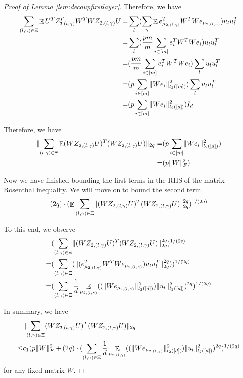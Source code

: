 \documentclass[11pt]{amsart}
\numberwithin{equation}{section}
\numberwithin{equation}{section}
\DeclareMathOperator{\E}{\mathbb{E}}
\DeclarePairedDelimiter{\norm}{\lVert}{\rVert}
\begin{document}
\begin{proof}[Proof of Lemma \ref{lem:decoupfirstlayer}]
Therefore, we have
\begin{align*}
    \sum \limits_{(l,\gamma) \in \Xi}\E U^TZ_{2,(l,\gamma)}^TW^TWZ_{2,(l,\gamma)}U=&\sum \limits_{l}(\sum \limits_{\gamma}\E e_{\mu_{2,(l,\gamma)}}^TW^TWe_{\mu_{2,(l,\gamma)}})u_lu_l^T
    \\=&\sum \limits_{l}(\frac{pm}{m}\sum \limits_{i \in [m]}e_{{i}}^TW^TWe_{i})u_lu_l^T
    \\=&(\frac{pm}{m}\sum \limits_{i \in [m]}e_{{i}}^TW^TWe_{{i}}) \sum \limits_{l}u_lu_l^T
    \\=&(p\sum \limits_{i \in [m]}\norm{We_{{i}}}_{l_2([m])}^2) \sum \limits_{l}u_lu_l^T
    \\=& (p\sum \limits_{i \in [m]}\norm{We_{{i}}}_{l_2([d])}^2) I_d
\end{align*}

Therefore, we have
\begin{align*}
    \norm{\sum \limits_{(l,\gamma) \in \Xi}\E(WZ_{2,(l,\gamma)}U)^T(WZ_{2,(l,\gamma)}U)}_{2q}=&(p\sum \limits_{i \in [m]}\norm{We_{i}}^2_{l_2([d])})
    \\=&(p\norm{W}_{F}^2)
\end{align*}

Now we have finished bounding the first terms in the RHS of the matrix Rosenthal inequality. We will move on to bound the second term
\begin{align*}
    (2q)\cdot (\E \sum \limits_{(l,\gamma) \in \Xi} \norm{(WZ_{2,(l,\gamma)}U)^T(WZ_{2,(l,\gamma)}U)}_{2q}^{2q})^{1/(2q)}
\end{align*}

To this end, we observe
\begin{align*}
    &(\sum \limits_{(l,\gamma) \in \Xi} \norm{(WZ_{2,(l,\gamma)}U)^T(WZ_{2,(l,\gamma)}U)}_{2q}^{2q})^{1/(2q)}
    \\ = &(\sum\limits_{(l,\gamma) \in \Xi}(\norm{(e_{\mu_{2,(l,\gamma)}}^TW^TWe_{\mu_{2,(l,\gamma)}})u_lu_l^T}_{2q}^{2q}))^{1/(2q)}
    \\ = & (\sum\limits_{(l,\gamma) \in \Xi}\frac{1}{d}\E_{\mu_{2,(l,\gamma)}}((\norm{We_{\mu_{2,(l,\gamma)}}}_{l_2([d])}^2)\norm{u_l}_{l_2([d])}^{2})^{2q})^{1/(2q)}
\end{align*}

In summary, we have
\begin{align*}
    &\norm{\sum \limits_{(l,\gamma) \in \Xi}(WZ_{2,(l,\gamma)}U)^T(WZ_{2,(l,\gamma)}U)}_{2q} \\\le& c_1 (p\norm{W}_{F}^2+(2q)\cdot (\sum\limits_{(l,\gamma) \in \Xi}\frac{1}{d}\E_{\mu_{2,(l,\gamma)}}((\norm{We_{\mu_{2,(l,\gamma)}}}_{l_2([d])}^2)\norm{u_l}_{l_2([d])}^{2})^{2q})^{1/(2q)}
\end{align*}
for any fixed matrix $W$.


\end{proof}
\end{document}
